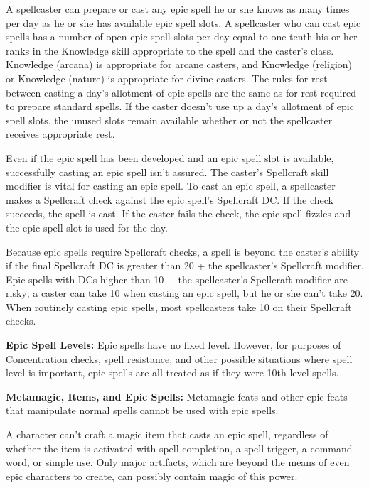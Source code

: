 \documentclass{article}
\begin{document}
A spellcaster can prepare or cast any epic spell he or she knows as many times 
per day as he or she has available epic spell slots. A spellcaster who can cast 
epic spells has a number of open epic spell slots per day equal to one-tenth his 
or her ranks in the Knowledge skill appropriate to the spell and the caster's class. 
Knowledge (arcana) is appropriate for arcane casters, and Knowledge (religion) 
or Knowledge (nature) is appropriate for divine casters. The rules for rest between 
casting a day's allotment of epic spells are the same as for rest required to prepare 
standard spells. If the caster doesn't use up a day's allotment of epic spell slots, 
the unused slots remain available whether or not the spellcaster receives appropriate 
rest. 

Even if the epic spell has been developed and an epic spell slot is available, 
successfully casting an epic spell isn't assured. The caster's Spellcraft skill 
modifier is vital for casting an epic spell. To cast an epic spell, a spellcaster 
makes a Spellcraft check against the epic spell's Spellcraft DC. If the check succeeds, 
the spell is cast. If the caster fails the check, the epic spell fizzles and the 
epic spell slot is used for the day. 

Because epic spells require Spellcraft checks, a spell is beyond the caster's ability 
if the final Spellcraft DC is greater than 20 + the spellcaster's Spellcraft modifier. 
Epic spells with DCs higher than 10 + the spellcaster's Spellcraft modifier are 
risky; a caster can take 10 when casting an epic spell, but he or she can't take 
20. When routinely casting epic spells, most spellcasters take 10 on their Spellcraft 
checks. 

\textbf{Epic Spell Levels:} Epic spells have no fixed level. However, for purposes 
of Concentration checks, spell resistance, and other possible situations where 
spell level is important, epic spells are all treated as if they were 10th-level 
spells. 

\textbf{Metamagic, Items, and Epic Spells:} Metamagic feats and other epic feats 
that manipulate normal spells cannot be used with epic spells. 

A character can't craft a magic item that casts an epic spell, regardless of whether 
the item is activated with spell completion, a spell trigger, a command word, or 
simple use. Only major artifacts, which are beyond the means of even epic characters 
to create, can possibly contain magic of this power. 
\end{document}
